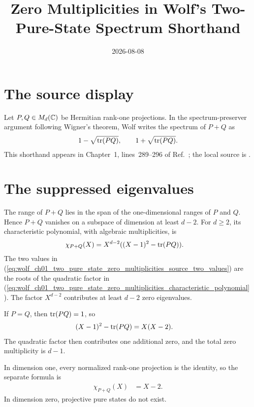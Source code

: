 \documentclass{article}
\title{Zero Multiplicities in Wolf's Two-Pure-State Spectrum Shorthand}
\author{}
\date{2026-08-08}
\begin{document}
\maketitle
{}

\section{The source display}

Let $P,Q\in M_d(\mathbb{C})$ be Hermitian rank-one projections. In the
spectrum-preserver argument following Wigner's theorem, Wolf writes the
spectrum of $P+Q$ as
\begin{align}
    1-\sqrt{\operatorname{tr}(PQ)},
    \qquad
    1+\sqrt{\operatorname{tr}(PQ)}.
    \label{eq:wolf_ch01_two_pure_state_zero_multiplicities_source_two_values}
\end{align}
This shorthand appears in Chapter~1, lines~289--296 of
Ref.~\cite{Wolf2012Quantum}; the local source is
.

\section{The suppressed eigenvalues}

The range of $P+Q$ lies in the span of the one-dimensional ranges of $P$ and
$Q$. Hence $P+Q$ vanishes on a subspace of dimension at least $d-2$. For
$d\geq2$, its characteristic polynomial, with algebraic multiplicities, is
\begin{align}
    \chi_{P+Q}(X)
        &=X^{d-2}((X-1)^2-\operatorname{tr}(PQ)).
    \label{eq:wolf_ch01_two_pure_state_zero_multiplicities_characteristic_polynomial}
\end{align}
The two values in
(\ref{eq:wolf_ch01_two_pure_state_zero_multiplicities_source_two_values}) are
the roots of the quadratic factor in
(\ref{eq:wolf_ch01_two_pure_state_zero_multiplicities_characteristic_polynomial}).
The factor $X^{d-2}$ contributes at least $d-2$ zero eigenvalues.

If $P=Q$, then $\operatorname{tr}(PQ)=1$, so
\begin{align}
    (X-1)^2-\operatorname{tr}(PQ)
        &=X(X-2).
    \label{eq:wolf_ch01_two_pure_state_zero_multiplicities_equal_projection_quadratic}
\end{align}
The quadratic factor then contributes one additional zero, and the total zero
multiplicity is $d-1$.

In dimension one, every normalized rank-one projection is the identity, so the
separate formula is
\begin{align}
    \chi_{P+Q}(X)
        &=X-2.
    \label{eq:wolf_ch01_two_pure_state_zero_multiplicities_dimension_one_charpoly}
\end{align}
In dimension zero, projective pure states do not exist.
\end{document}
